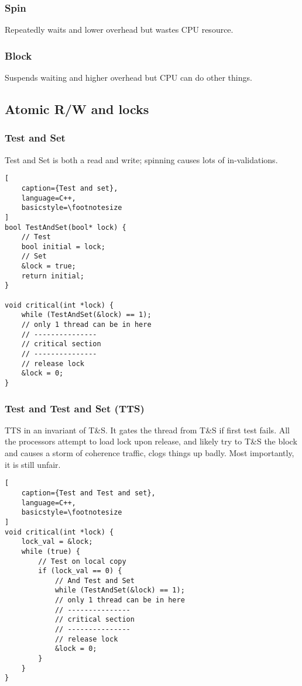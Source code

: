 \documentclass{article}
\begin{document}
\begin{multicols*}{2}
\subsubsection{Spin}
Repeatedly waits and lower overhead but wastes CPU resource.
\subsubsection{Block}
Suspends waiting and higher overhead but CPU can do other things.

\subsection{Atomic R/W and locks}
\subsubsection{Test and Set}
Test and Set is both a read and write; spinning causes lots of in-validations.
\begin{lstlisting}[
    caption={Test and set},
    language=C++, 
    basicstyle=\footnotesize
]
bool TestAndSet(bool* lock) {
    // Test
    bool initial = lock;
    // Set
    &lock = true;
    return initial;
}

void critical(int *lock) {
    while (TestAndSet(&lock) == 1);
    // only 1 thread can be in here
    // ---------------
    // critical section
    // ---------------
    // release lock
    &lock = 0;
}
\end{lstlisting}

\subsubsection{Test and Test and Set (TTS)}
TTS in an invariant of T\&S. It gates the thread from T\&S if first test fails. All the processors attempt to load lock upon release, and likely try to T\&S the block and causes a storm of coherence traffic, clogs things up badly. Most importantly, it is still unfair.
\begin{lstlisting}[
    caption={Test and Test and set},
    language=C++, 
    basicstyle=\footnotesize
]
void critical(int *lock) {
    lock_val = &lock;
    while (true) {
        // Test on local copy
        if (lock_val == 0) {
            // And Test and Set
            while (TestAndSet(&lock) == 1);
            // only 1 thread can be in here
            // ---------------
            // critical section
            // ---------------
            // release lock
            &lock = 0;
        }
    }
}
\end{lstlisting}


\end{multicols*}
\end{document}
